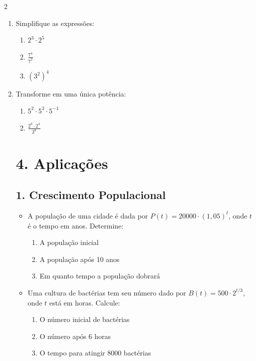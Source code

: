 \documentclass[11pt]{article}
\begin{document}
\begin{multicols}{2}
\begin{enumerate}
        \item Simplifique as expressões:
            \begin{enumerate}[label=\alph*)]
                \item $2^3 \cdot 2^5$
                \item $\frac{7^4}{7^2}$
                \item $(3^2)^4$
            \end{enumerate}

        \item Transforme em uma única potência:
            \begin{enumerate}[label=\alph*)]
                \item $5^2 \cdot 5^3 \cdot 5^{-1}$
                \item $\frac{2^6 \cdot 2^4}{2^8}$
            \end{enumerate}

            \section*{4. Aplicações}
            \subsection*{1. Crescimento Populacional}
            \begin{itemize}
                \item A população de uma cidade é dada por $P(t) = 20000 \cdot (1,05)^t$, onde $t$ é o tempo em anos. Determine:
                    \begin{enumerate}[label=\alph*)]
                        \item A população inicial
                        \item A população após 10 anos
                        \item Em quanto tempo a população dobrará
                    \end{enumerate}

                \item Uma cultura de bactérias tem seu número dado por $B(t) = 500 \cdot 2^{t/3}$, onde $t$ está em horas. Calcule:
                    \begin{enumerate}[label=\alph*)]
                        \item O número inicial de bactérias
                        \item O número após 6 horas
                        \item O tempo para atingir 8000 bactérias
                    \end{enumerate}
            \end{itemize}


\end{enumerate}
\end{multicols}
\end{document}
